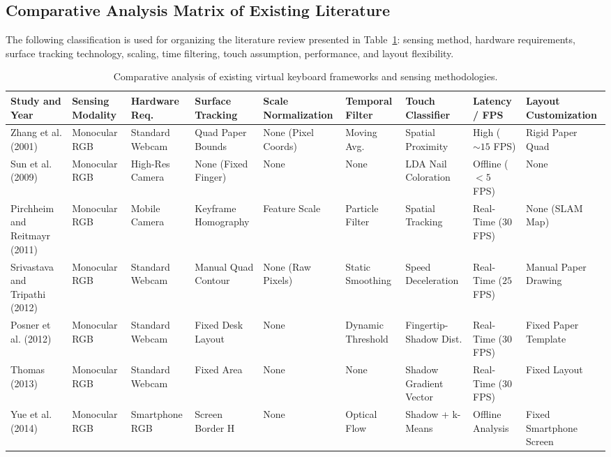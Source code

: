 \subsection{Comparative Analysis Matrix of Existing Literature}
\label{subsec:lit_comparative_matrix}
The following classification is used for organizing the literature review presented in Table~\ref{tab:lit_comparative_matrix}: sensing method, hardware requirements, surface tracking technology, scaling, time filtering, touch assumption, performance, and layout flexibility.

\begin{table}[htbp]
\centering
\caption{Comparative analysis of existing virtual keyboard frameworks and sensing methodologies.}
\label{tab:lit_comparative_matrix}
\begin{tabular}{l l l l l l l l l}
\toprule
\textbf{Study and Year} & \textbf{Sensing Modality} & \textbf{Hardware Req.} & \textbf{Surface Tracking} & \textbf{Scale Normalization} & \textbf{Temporal Filter} & \textbf{Touch Classifier} & \textbf{Latency / FPS} & \textbf{Layout Customization} \\
\midrule
Zhang et al. (2001) \cite{Zhang2001Visual} & Monocular RGB & Standard Webcam & Quad Paper Bounds & None (Pixel Coords) & Moving Avg. & Spatial Proximity & High ($\sim 15$ FPS) & Rigid Paper Quad \\
Sun et al. (2009) \cite{Sun2009Estimation} & Monocular RGB & High-Res Camera & None (Fixed Finger) & None & None & LDA Nail Coloration & Offline ($< 5$ FPS) & None \\
Pirchheim and Reitmayr (2011) \cite{Pirchheim2011Homography} & Monocular RGB & Mobile Camera & Keyframe Homography & Feature Scale & Particle Filter & Spatial Tracking & Real-Time ($30$ FPS) & None (SLAM Map) \\
Srivastava and Tripathi (2012) \cite{Srivastava2012RealTime} & Monocular RGB & Standard Webcam & Manual Quad Contour & None (Raw Pixels) & Static Smoothing & Speed Deceleration & Real-Time ($25$ FPS) & Manual Paper Drawing \\
Posner et al. (2012) \cite{Posner2012Single} & Monocular RGB & Standard Webcam & Fixed Desk Layout & None & Dynamic Threshold & Fingertip-Shadow Dist. & Real-Time ($30$ FPS) & Fixed Paper Template \\
Thomas (2013) \cite{Thomas2013Camera} & Monocular RGB & Standard Webcam & Fixed Area & None & None & Shadow Gradient Vector & Real-Time ($30$ FPS) & Fixed Layout \\
Yue et al. (2014) \cite{Yue2014Blind} & Monocular RGB & Smartphone RGB & Screen Border H & None & Optical Flow & Shadow + k-Means & Offline Analysis & Fixed Smartphone Screen \\

\end{tabular}
\end{table}
